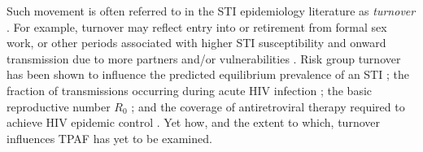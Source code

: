 Such movement is often referred to in the STI epidemiology literature as
\textit{turnover} \citep{Watts2010}.
For example, turnover may reflect entry into or retirement from formal sex work,
or other periods associated with higher STI susceptibility and onward transmission
due to more partners and/or vulnerabilities
\citep{Marston2006,Watts2010}.
Risk group turnover has been shown to
influence the predicted equilibrium prevalence of an STI \citep{Stigum1994,Zhang2012};
the fraction of transmissions occurring during acute HIV infection \citep{Zhang2012};
the basic reproductive number $R_0$ \citep{Henry2015}; and
the coverage of antiretroviral therapy required to achieve HIV epidemic control \citep{Henry2015}.
Yet how, and the extent to which, turnover influences TPAF has yet to be examined.


